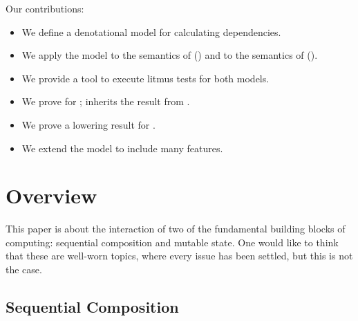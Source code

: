 Our contributions:
\begin{itemize}
\item We define a denotational model for calculating dependencies.
\item We apply the model to the \cXI{} semantics of
  \cite{DBLP:conf/esop/PaviottiCPWOB20} (\PwTc) and to the \mca{} semantics of
  \cite{DBLP:journals/pacmpl/JagadeesanJR20} (\PwTmca{}).
\item We provide a tool to execute litmus tests for both models.
\item We prove \drfsc{} for \PwP{}; \MRD{} inherits the result from \rcXI.
\item We prove a lowering result for \PwP{}.
\item We extend the model to include many features.
\end{itemize}


\section{Overview}
\label{sec:overview}

This paper is about the interaction of two of the fundamental building blocks
of computing: sequential composition and mutable state. One would like to
think that these are well-worn topics, where every issue has been settled,
but this is not the case.

\subsection{Sequential Composition} %

